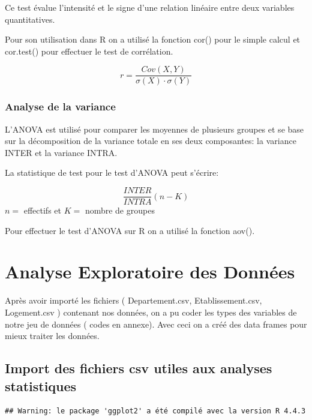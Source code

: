 \documentclass[mstat,12pt]{unswthesis}
\begin{document}
Ce test évalue l'intensité et le signe d'une relation linéaire entre
deux variables quantitatives. \medskip

Pour son utilisation dans R on a utilisé la fonction cor() pour le
simple calcul et cor.test() pour effectuer le test de corrélation.
\medskip

\begin{center} 

$$
r =\frac {{Cov}(X,Y)} {\sigma(X) \cdot \sigma (Y)}
$$

\end{center}
\medskip

\subsection{Analyse de la variance}\label{analyse-de-la-variance}

L'ANOVA est utilisé pour comparer les moyennes de plusieurs groupes et
se base sur la décomposition de la variance totale en ses deux
composantes: la variance INTER et la variance INTRA. \medskip

La statistique de test pour le test d'ANOVA peut s'écrire:

\[
\frac {INTER} {INTRA}  (n-K)
\] \(n=\) effectifs et \(K=\) nombre de groupes

\medskip

Pour effectuer le test d'ANOVA sur R on a utilisé la fonction aov().

\bigskip

\chapter{Analyse Exploratoire des
Données}\label{analyse-exploratoire-des-donnuxe9es}

Après avoir importé les fichiers ( Departement.csv, Etablissement.csv,
Logement.csv ) contenant nos données, on a pu coder les types des
variables de notre jeu de données ( codes en annexe). Avec ceci on a
créé des data frames pour mieux traiter les données.

\bigskip

\section{Import des fichiers csv utiles aux analyses
statistiques}\label{import-des-fichiers-csv-utiles-aux-analyses-statistiques}

\begin{verbatim}
## Warning: le package 'ggplot2' a été compilé avec la version R 4.4.3
\end{verbatim}
\end{document}
